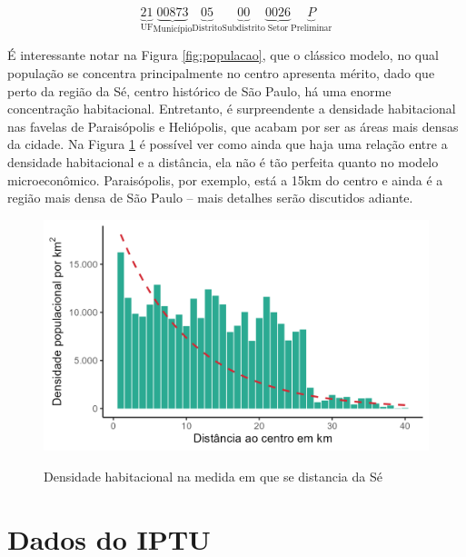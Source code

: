 \begin{equation*}
    \underbrace{21}_\text{UF} \underbrace{00873}_\text{Município} \underbrace{05}_\text{Distrito} \underbrace{00}_\text{Subdistrito} \underbrace{0026}_\text{Setor} \underbrace{P}_\text{Preliminar}
    \label{eq:setor}
\end{equation*}

É interessante notar na Figura \ref{fig:populacao}, que o clássico modelo, no qual população se concentra principalmente no centro apresenta mérito, dado que perto da região da Sé, centro histórico de São Paulo, há uma enorme concentração habitacional. Entretanto, é surpreendente a densidade habitacional nas favelas de Paraisópolis e Heliópolis, que acabam por ser as áreas mais densas da cidade. Na Figura \ref{fig:dens-distcentro} é possível ver como ainda que haja uma relação entre a densidade habitacional e a distância, ela não é tão perfeita quanto no modelo microeconômico. Paraisópolis, por exemplo, está a 15km do centro e ainda é a região mais densa de São Paulo -- mais detalhes serão discutidos adiante.

\begin{figure}[h]
    \centering
    \caption{Densidade habitacional na medida em que se distancia da Sé}
    \includegraphics[width = .75\linewidth]{imagens/densidade_distcentro.png}
    \label{fig:dens-distcentro}
\end{figure}

\section*{Dados do IPTU}

